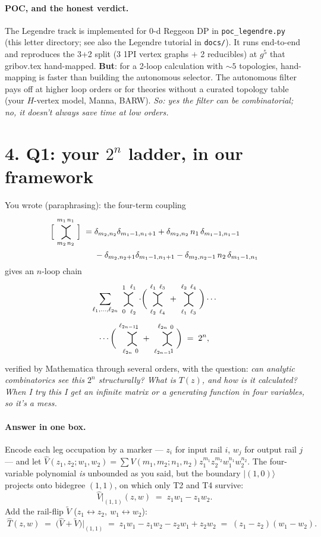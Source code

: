 \documentclass[11pt,a4paper]{article}
\newcommand{\Hvert}[4]{%
\begin{tikzpicture}[baseline=-0.5ex,scale=0.65]
  \draw[thick] (-0.3,0.45) node[above]{\scriptsize $#1$} -- (0,0.25);
  \draw[thick] (0.3,0.45) node[above]{\scriptsize $#2$} -- (0,0.25);
  \draw[thick] (0,0.25)--(0,-0.25);
  \draw[thick] (-0.3,-0.45) node[below]{\scriptsize $#3$} -- (0,-0.25);
  \draw[thick] (0.3,-0.45) node[below]{\scriptsize $#4$} -- (0,-0.25);
\end{tikzpicture}}
\begin{document}
\paragraph{POC, and the honest verdict.} The Legendre track is implemented for 0-d Reggeon DP in \texttt{poc\_legendre.py} (this letter directory; see also the Legendre tutorial in \texttt{docs/}). It runs end-to-end and reproduces the 3+2 split (3 1PI vertex graphs $+$ 2 reducibles) at $g^5$ that gribov.tex hand-mapped. \textbf{But}: for a 2-loop calculation with $\sim 5$ topologies, hand-mapping is faster than building the autonomous selector. The autonomous filter pays off at higher loop orders or for theories without a curated topology table (your $H$-vertex model, Manna, BARW). \emph{So: yes the filter can be combinatorial; no, it doesn't always save time at low orders.}

\section*{4. Q1: your $2^n$ ladder, in our framework}

You wrote (paraphrasing): the four-term coupling
\begin{align*}
\Big[\Hvert{m_1}{n_1}{m_2}{n_2}\Big]
\;=\;& \delta_{m_2,n_2}\delta_{m_1{-}1,n_1{+}1}
+ \delta_{m_2,n_2}\,n_1\,\delta_{m_1{-}1,n_1{-}1}\\
&{} - \delta_{m_2,n_2{+}1}\delta_{m_1{-}1,n_1{+}1}
- \delta_{m_2,n_2{-}1}\,n_2\,\delta_{m_1{-}1,n_1}
\end{align*}
gives an $n$-loop chain
\begin{align*}
\sum_{\ell_1,\dots,\ell_{2n}}
\Hvert{1}{\ell_1}{0}{\ell_2}\cdot&
\bigg(\Hvert{\ell_1}{\ell_3}{\ell_2}{\ell_4}+\Hvert{\ell_2}{\ell_4}{\ell_1}{\ell_3}\bigg)\cdots\\
\cdots\bigg(\Hvert{\ell_{2n-1}}{1}{\ell_{2n}}{0}&{}+\Hvert{\ell_{2n}}{0}{\ell_{2n-1}}{1}\bigg)
\;=\; 2^n,
\end{align*}
verified by Mathematica through several orders, with the question: \emph{can analytic combinatorics see this $2^n$ structurally? What is $T(z)$, and how is it calculated? When I try this I get an infinite matrix or a generating function in four variables, so it's a mess.}

\paragraph{Answer in one box.} Encode each leg occupation by a marker --- $z_i$ for input rail $i$, $w_j$ for output rail $j$ --- and let $\widehat V(z_1,z_2;w_1,w_2) = \sum V(m_1,m_2;n_1,n_2) z_1^{m_1}z_2^{m_2}w_1^{n_1}w_2^{n_2}$. The four-variable polynomial \emph{is} unbounded as you said, but the boundary $|(1,0)\rangle$ projects onto bidegree $(1,1)$, on which only T2 and T4 survive:
\[
\widehat V\big|_{(1,1)}(z,w) \;=\; z_1 w_1 - z_1 w_2.
\]
Add the rail-flip $\widetilde V$ ($z_1\!\leftrightarrow\!z_2,\ w_1\!\leftrightarrow\!w_2$):
\[
\boxed{\;
\widehat T(z,w) \;=\; \bigl(\widehat V + \widetilde V\bigr)\big|_{(1,1)}
\;=\; z_1w_1 - z_1w_2 - z_2w_1 + z_2w_2
\;=\; (z_1-z_2)(w_1-w_2).
\;}
\]
\end{document}
